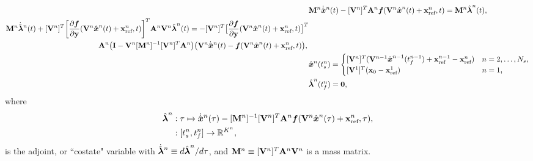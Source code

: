 \begin{align}\label{eq:lspg_continuous} 
&\massArg{n}   \genstateDotArg{n}{t}  -  [\basisspaceArg{n}]^T
\stweightingMatArgt{n}{t} \velocity(\veloargsromn) =  \massArg{n} \adjointArg{n}{t} , \\
\begin{split}
 &\massArg{n}  \adjointDotArg{n}{t}  + [\basisspaceArg{n}]^T \bigg[\frac{\partial
\velocity}{\partial \stateyDiscrete} (\veloargsromn) \bigg]^T \stweightingMatArgt{n}{t} \basisspaceArg{n}
 \adjointArg{n}{t} = -[\basisspaceArg{n}]^T \big[
\frac{\partial \velocity}{\partial \stateyDiscrete}(\veloargsromn) \big]^T \\& \hspace{1.7 in} \stweightingMatArgt{n}{t} \big( \mathbf{I} -
\basisspaceArg{n} [\massArg{n}]^{-1} [\basisspaceArg{n}]^T \stweightingMatArgt{n}{t} \big)
 \big( \basisspaceArg{n} \genstateDotArg{n}{t} -
\velocity(\veloargsromn) \big), \label{eq:lspg_adjoint}
\end{split}
 \\ &
\genstateArg{n}{\timeStartArg{n}} = \begin{cases}
\spatialIC & n=2,\ldots,\nslabs, \label{eq:lspg_bcs1}\\
\genstateICOne & n=1, \end{cases}\\ &
\adjointArg{n}{\timeEndArg{n}} = \boldsymbol 0, \label{eq:lspg_bcs} 
\end{align}
where 
\begin{equation}\label{eq:costate_def}
\begin{split}
\hat{\boldsymbol \lambda}^{n} &: \tau \mapsto \dot{\hat{ \boldsymbol x}}^{n}(\tau)  -  [\mathbf{M}^{n}]^{-1} [\mathbf {V}^{n}]^T \mathbf{A}^{n}\boldsymbol f(\mathbf {V}^{n} \hat{ \boldsymbol x}^{n}(\tau) + \mathbf{x}_\text{ref}^{n} , \tau ) ,\\
&: [t_s^{n},t_f^{n}] \rightarrow \mathbb{R}^{K^{n}} ,
\end{split}
\end{equation}
is the adjoint, or ``costate" variable with $\dot{\hat{\boldsymbol \lambda}}^{n} \equiv d \hat{\boldsymbol \lambda}^{n}/ d\tau$, and $\mathbf{M}^{n} \equiv [\mathbf {V}^{n}]^T \mathbf{A}^{n} \mathbf {V}^{n}$ is a mass matrix. 
